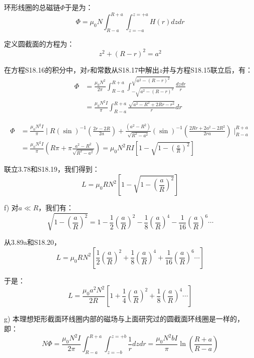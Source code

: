 环形线圈的总磁链$\Phi$于是为：
\begin{equation*}%
\Phi=\mu_0N\int_{R-a}^{R+a}\int_{z=-a}^{z=+a}H(r)dzdr \tag{S18.16}
\end{equation*}

定义圆截面的方程为：
 \begin{equation*}%
z^2+(R-r)^2=a^2 \tag{S18.17}
\end{equation*}

在方程S18.16的积分中，对$r$和常数从S18.17中解出$z$并与方程S18.15联立后，有：
\begin{align*}%
\Phi&=\frac{\mu_0N^2}{2\pi}\int_{R-a}^{R+a}\int_{-\sqrt{a^2-(R-r)^2}}^{\sqrt{a^2-(R-r)^2}}\frac{dzdr}{r}\\
&=\frac{\mu_0N^2I}{\pi}\int_{R-a}^{R+a}\frac{\sqrt{a^2-R^2+2Rr-r^2}}{r}dr\tag{S18.18}
\end{align*}

\begin{align*}%
\Phi&=\frac{\mu_0N^2I}{\pi}\mid R(\sin)^{-1}(\frac{2r-2R}{2a})+\frac{(a^2-R^2)}{\sqrt{R^2-a^2}}(\sin)^{-1}(\frac{2Rr+2a^2-2R^2}{2ra})\mid_{R-a}^{R+a} \\
&=\frac{\mu_0N^2I}{\pi}(R\pi+\pi\frac{a^2-R^2}{\sqrt{R^2-a^2}})=\mu_0N^2RI[1-\sqrt{1-(\frac{a}{R})^2}]\tag{S18.19}
\end{align*}

联立3.78和S18.19，我们得到：
 \begin{equation*}%
L=\mu_0RN^2\left[1-\sqrt{1-\left(\frac{a}{R}\right)^2}\right] \tag{3.89a}
\end{equation*}

f) 对$a\ll R$，我们有：
\begin{equation*}%
\sqrt{1-\left(\frac{a}{R}\right)^2}=1-\frac{1}{2}(\frac{a}{R})^2-\frac{1}{8}(\frac{a}{R})^4-\frac{1}{16}(\frac{a}{R})^6\cdots \tag{S18.20}
\end{equation*}

从3.89a和S18.20，
\begin{equation*}
L=\mu_0RN^2\left[\frac{1}{2}(\frac{a}{R})^2+\frac{1}{8}(\frac{a}{R})^4+\frac{1}{16}(\frac{a}{R})^6\cdots\right]
\end{equation*}

于是：
 \begin{equation*}%
L=\frac{\mu_0a^2N^2}{2R}\left[1+\frac{1}{4}(\frac{a}{R})^2+\frac{1}{8}(\frac{a}{R})^4\cdots\right] \tag{3.89b}
\end{equation*}

g) 本理想矩形截面环线圈内部的磁场与上面研究过的圆截面环线圈是一样的，即：
 \begin{equation*}%
N\Phi=\frac{\mu_0N^2I}{2\pi}\int_{R-a}^{R+a}\int_{z=-b}^{z=+b}\frac{1}{r}dzdr
=\frac{\mu_0N^2bI}{\pi}\ln\left(\frac{R+a}{R-a}\right) \tag{S18.21}
\end{equation*}

